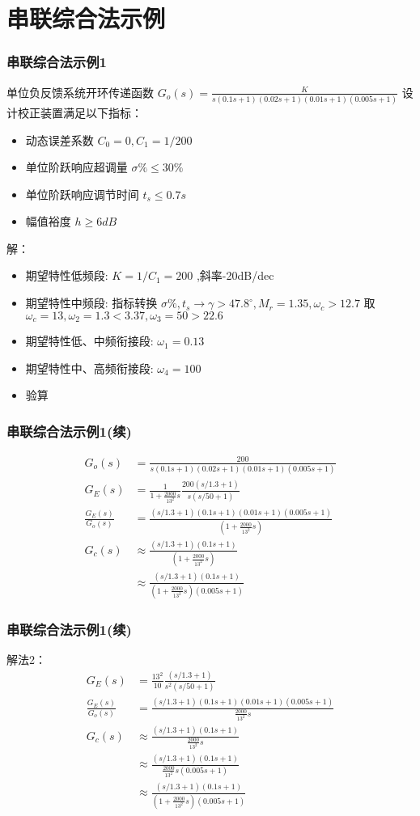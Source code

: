 \documentclass[table]{beamer}
\begin{document}
\section{串联综合法示例}
\label{sec-2}
\begin{frame}
\frametitle{串联综合法示例1}
\label{sec-2-1}

   单位负反馈系统开环传递函数 $G_o(s)=\frac{K}{s(0.1s+1)(0.02s+1)(0.01s+1)(0.005s+1)}$ 设计校正装置满足以下指标：
\begin{itemize}
\item 动态误差系数 $C_0=0,C_1=1/200$
\item 单位阶跃响应超调量 $\sigma\%\leq30\%$
\item 单位阶跃响应调节时间 $t_s\leq 0.7s$
\item 幅值裕度 $h\geq 6dB$
\end{itemize}
解：
\begin{itemize}
\item <2-> 期望特性低频段: $K=1/C_1=200$ ,斜率-20dB/dec
\item <3-> 期望特性中频段: 指标转换 $\sigma\%,t_s\to \gamma>47.8^{\circ},M_r=1.35,\omega_c>12.7$ 取 $\omega_c=13,\omega_2=1.3<3.37,\omega_3=50>22.6$
\item <4-> 期望特性低、中频衔接段: $\omega_1=0.13$
\item <5-> 期望特性中、高频衔接段: $\omega_4=100$
\item <6-> 验算
\end{itemize}
\end{frame}
\begin{frame}
\frametitle{串联综合法示例1(续)}
\label{sec-2-2}

\begin{align*}
G_o(s) &=\frac{200}{s(0.1s+1)(0.02s+1)(0.01s+1)(0.005s+1)} \\
G_E(s) &=\frac{1}{1+\frac{2000}{13^2} s}\frac{200(s/1.3+1)}{s(s/50+1)} \\
\frac{G_E(s)}{G_o(s)} &=\frac{(s/1.3+1)(0.1s+1)(0.01s+1)(0.005s+1)}{(1+\frac{2000}{13^2}s)} \\
G_c(s) &\approx \frac{(s/1.3+1)(0.1s+1)}{(1+\frac{2000}{13^2}s)} \\
&\approx \frac{(s/1.3+1)(0.1s+1)}{(1+\frac{2000}{13^2}s)(0.005s+1)}
\end{align*}
\end{frame}
\begin{frame}
\frametitle{串联综合法示例1(续)}
\label{sec-2-3}

解法2：
\begin{align*}
G_E(s) &=\frac{13^2}{10}\frac{(s/1.3+1)}{s^2(s/50+1)} \\
\frac{G_E(s)}{G_o(s)} &=\frac{(s/1.3+1)(0.1s+1)(0.01s+1)(0.005s+1)}{\frac{2000}{13^2}s} \\
G_c(s) &\approx \frac{(s/1.3+1)(0.1s+1)}{\frac{2000}{13^2}s} \\
&\approx \frac{(s/1.3+1)(0.1s+1)}{\frac{2000}{13^2}s(0.005s+1)}\\
&\approx \frac{(s/1.3+1)(0.1s+1)}{(1+\frac{2000}{13^2}s)(0.005s+1)}
\end{align*}
\end{frame}
\end{document}
